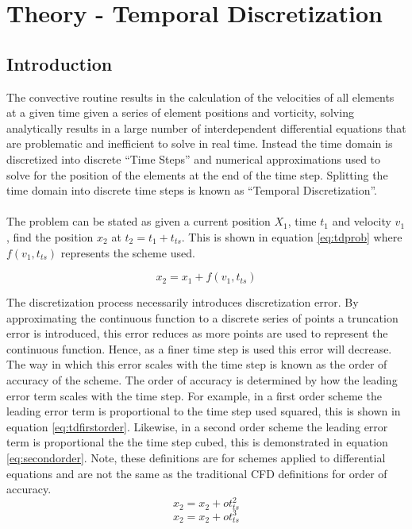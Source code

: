 \section{Theory - Temporal Discretization}
\subsection{Introduction}
The convective routine results in the calculation of the velocities of all elements at a given time given a series of element positions and vorticity, solving analytically results in a large number of interdependent differential equations that are problematic and inefficient to solve in real time. Instead the time domain is discretized into discrete “Time Steps” and numerical approximations used to solve for the position of the elements at the end of the time step. Splitting the time domain into discrete time steps is known as “Temporal Discretization”.
\\\\
The problem can be stated as given a current position $X_{1}$, time $t_{1}$ and velocity $v_{1}$, find the position $x_{2}$ at $t_{2}=t_{1}+t_{ts}$. This is shown in equation \ref{eq:tdprob} where $f(v_{1},t_{ts})$ represents the scheme used.

\begin{equation}
\label{eq:tdprob}
x_{2}=x_{1}+f(v_{1},t_{ts})
\end{equation}

The discretization process necessarily introduces discretization error. By approximating the continuous function to a discrete series of  points a truncation error is introduced, this error reduces as more points are used to represent the continuous function. Hence, as a finer time step is used this error will decrease. The way in which this error scales with the time step is known as the order of accuracy of the scheme. The order of accuracy is determined by how the leading error term scales with the time step. For example, in a first order scheme the leading error term is proportional to the time step used squared, this is shown in equation \ref{eq:tdfirstorder}. Likewise, in a second order scheme the leading error term is proportional the the time step cubed, this is demonstrated in equation \ref{eq:secondorder}. Note, these definitions are for schemes applied to differential equations and are not the same as the traditional CFD definitions for order of accuracy.
\begin{equation}
\label{eq:tdfirstorder}
x_{2}=x_{2}+ot_{ts}^2
\end{equation}
\begin{equation}
\label{eq:secondorder}
x_{2}=x_{2}+ot_{ts}^3
\end{equation}

